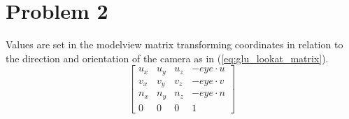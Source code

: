 \section*{Problem 2}
Values are set in the modelview matrix transforming coordinates in relation to
the direction and orientation of the camera as in (\ref{eq:glu_lookat_matrix}).
\begin{equation}
    \begin{bmatrix}
        u_x & u_y & u_z & -eye \cdot u \\
        v_x & v_y & v_z & -eye \cdot v \\
        n_x & n_y & n_z & -eye \cdot n \\
        0 & 0 & 0 & 1
    \end{bmatrix}
    \label{eq:glu_lookat_matrix}
\end{equation}


